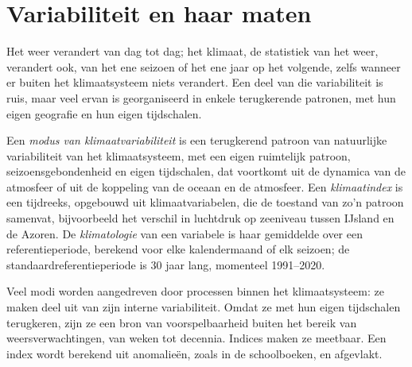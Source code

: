 \section{Variabiliteit en haar maten}\label{sec:b2:climate-variability:measures}

Het weer verandert van dag tot dag; het klimaat, de statistiek van het weer, verandert ook, van het ene seizoen
of het ene jaar op het volgende, zelfs wanneer er buiten het klimaatsysteem niets verandert. Een deel van die
variabiliteit is ruis, maar veel ervan is georganiseerd in enkele terugkerende patronen, met hun eigen
geografie en hun eigen tijdschalen.

\begin{definition}\label{def:b2:climate-variability:modes}
Een \emph{modus van klimaatvariabiliteit} is een terugkerend patroon van
natuurlijke variabiliteit van het klimaatsysteem, met een eigen ruimtelijk patroon, seizoensgebondenheid en eigen
tijdschalen, dat voortkomt uit de dynamica van de atmosfeer of uit de koppeling van de oceaan en de
atmosfeer. Een \emph{klimaatindex} is een tijdreeks, opgebouwd uit
klimaatvariabelen, die de toestand van zo'n patroon samenvat, bijvoorbeeld het verschil in luchtdruk op zeeniveau
tussen IJsland en de Azoren. De \emph{klimatologie} van een variabele
is haar gemiddelde over een referentieperiode, berekend voor elke kalendermaand of elk seizoen; de
standaardreferentieperiode is 30 jaar lang, momenteel 1991--2020.
\end{definition}

Veel modi worden aangedreven door processen binnen het klimaatsysteem: ze maken deel uit van zijn
interne variabiliteit. Omdat ze met hun eigen tijdschalen terugkeren, zijn ze een bron van
voorspelbaarheid buiten het bereik van weersverwachtingen, van weken tot decennia. Indices maken ze
meetbaar. Een index wordt berekend uit anomalieën, zoals in de schoolboeken, en
afgevlakt.

